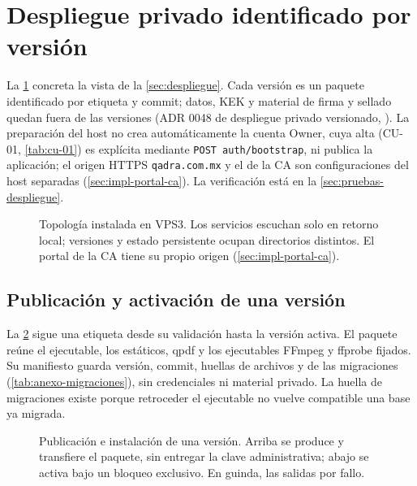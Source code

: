 \section{Despliegue privado identificado por versión}\label{sec:impl-despliegue}

La \cref{fig:impl-despliegue-topologia} concreta la vista de la \cref{sec:despliegue}. Cada versión es un paquete identificado por etiqueta y commit; datos, KEK y material de firma y sellado quedan fuera de las versiones (ADR 0048 de despliegue privado versionado, ). La preparación del host no crea automáticamente la cuenta Owner, cuya alta (CU-01, \cref{tab:cu-01}) es explícita mediante \texttt{POST auth/bootstrap}, ni publica la aplicación; el origen HTTPS \texttt{qadra.com.mx} y el de la CA son configuraciones del host separadas (\cref{sec:impl-portal-ca}). La verificación está en la \cref{sec:pruebas-despliegue}.

\begin{figure}[!htbp]
  \centering
  
  \caption{Topología instalada en VPS3. Los servicios escuchan solo en retorno local; versiones y estado persistente ocupan directorios distintos. El portal de la CA tiene su propio origen (\cref{sec:impl-portal-ca}).}
  \label{fig:impl-despliegue-topologia}
\end{figure}

\subsection{Publicación y activación de una versión}

La \cref{fig:impl-despliegue-pipeline} sigue una etiqueta desde su validación hasta la versión activa. El paquete reúne el ejecutable, los estáticos, qpdf y los ejecutables FFmpeg y ffprobe fijados. Su manifiesto guarda versión, commit, huellas de archivos y de las migraciones (\cref{tab:anexo-migraciones}), sin credenciales ni material privado. La huella de migraciones existe porque retroceder el ejecutable no vuelve compatible una base ya migrada.

\begin{figure}[!tb]
  \centering
  
  \caption{Publicación e instalación de una versión. Arriba se produce y transfiere el paquete, sin entregar la clave administrativa; abajo se activa bajo un bloqueo exclusivo. En guinda, las salidas por fallo.}
  \label{fig:impl-despliegue-pipeline}
\end{figure}

